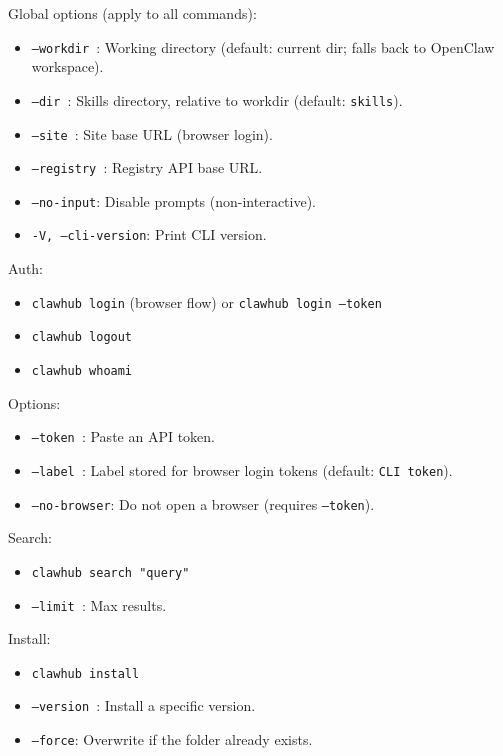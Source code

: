 Global options (apply to all commands):

\begin{itemize}
  \item \texttt{--workdir }: Working directory (default: current dir; falls back to OpenClaw workspace).
  \item \texttt{--dir }: Skills directory, relative to workdir (default: \texttt{skills}).
  \item \texttt{--site }: Site base URL (browser login).
  \item \texttt{--registry }: Registry API base URL.
  \item \texttt{--no-input}: Disable prompts (non-interactive).
  \item \texttt{-V, --cli-version}: Print CLI version.
\end{itemize}


Auth:

\begin{itemize}
  \item \texttt{clawhub login} (browser flow) or \texttt{clawhub login --token }
  \item \texttt{clawhub logout}
  \item \texttt{clawhub whoami}
\end{itemize}


Options:

\begin{itemize}
  \item \texttt{--token }: Paste an API token.
  \item \texttt{--label }: Label stored for browser login tokens (default: \texttt{CLI token}).
  \item \texttt{--no-browser}: Do not open a browser (requires \texttt{--token}).
\end{itemize}


Search:

\begin{itemize}
  \item \texttt{clawhub search "query"}
  \item \texttt{--limit }: Max results.
\end{itemize}


Install:

\begin{itemize}
  \item \texttt{clawhub install }
  \item \texttt{--version }: Install a specific version.
  \item \texttt{--force}: Overwrite if the folder already exists.
\end{itemize}


